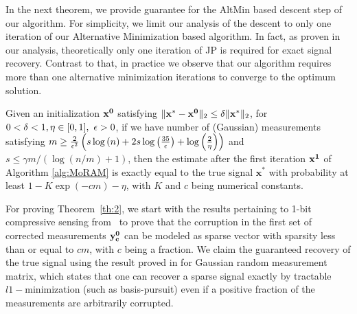 In the next theorem, we provide guarantee for the AltMin based descent step of our algorithm. For simplicity, we limit our analysis of the descent to only one iteration of our Alternative Minimization based algorithm. In fact, as proven in our analysis, theoretically only one iteration of JP is required for exact signal recovery. Contrast to that, in practice we observe that our algorithm requires more than one alternative minimization iterations to converge to the optimum solution.
\begin{theorem}
	Given an initialization $\mathbf{x^0}$ satisfying $\|\mathbf{x^* - x^0}\|_2 \leq \delta\|\mathbf{x^*}\|_2$, for $0 < \delta < 1, \eta \in [0,1],~\epsilon > 0$, if we have number of (Gaussian) measurements satisfying $m \geq \frac{2}{\epsilon^2}\left(s\log{(n)} + 2s\log{\left(\frac{35}{\epsilon}\right)}+\log{\left(\frac{2}{\eta}\right)}\right)$ and $s \leq \gamma m/\left(\log\left(n/m\right)+1\right)$, then the estimate after the first iteration $\mathbf{x^1}$ of Algorithm \ref{alg:MoRAM} is exactly equal to the true signal $\mathbf{x^*}$ with probability at least $1-K\exp(-cm)-\eta$, with $K$ and $c$ being numerical constants.
	\label{th:2}
\end{theorem}
For proving Theorem~\ref{th:2}, we start with the results pertaining to 1-bit compressive sensing from~\cite{Jacques2013} to prove that the corruption in the first set of corrected measurements $\mathbf{y_c^0}$ can be modeled as sparse vector with sparsity less than or equal to $cm$, with $c$ being a fraction.  We claim the guaranteed recovery of the true signal using the result proved in \cite{li2013compressed} for Gaussian random measurement matrix, which states that one can recover a sparse signal exactly by tractable $\mathit{l1}-$minimization (such as basis-pursuit) even if a positive fraction of the measurements are arbitrarily corrupted.
